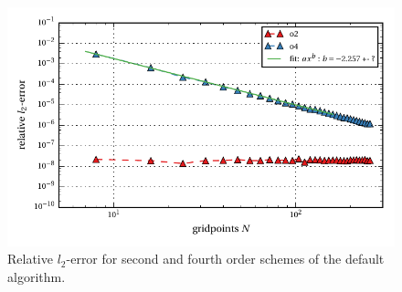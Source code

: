 \begin{figure}[!bp]
    \centering
    \includegraphics{gfx/immersed_boundary/poiseuille_flow/1_default/relative_l2error.pdf}
    \caption{Relative $l_2$-error for second and fourth order schemes of the default algorithm.\label{fig:ema1}}
\end{figure}

